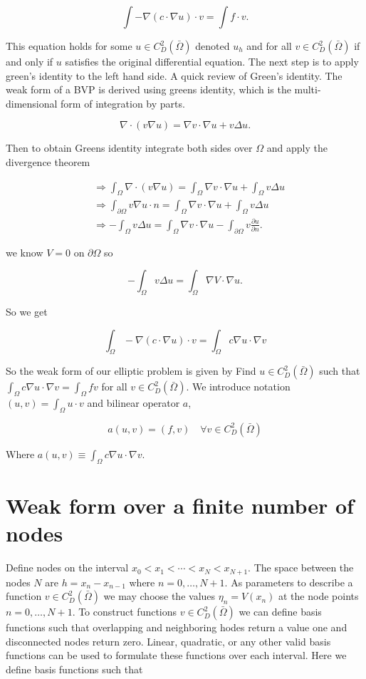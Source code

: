 \documentclass[12pt, oneside]{book}
\begin{document}
$$
\int-\nabla(c \cdot \nabla u) \cdot v=\int f \cdot v.
$$

This equation holds for some $u \in C_{D}^{2}(\bar{\Omega})$ denoted $u_{h}$ and for all 
$v \in C_{D}^{2}(\bar{\Omega})$ if and only if $u$ satisfies the original differential 
equation. The next step is to apply green's identity to the left hand side. A quick 
review of Green's identity. The weak form of a BVP is derived using greens 
identity, which is the multi-dimensional form of integration by parts.

$$
\nabla \cdot(v \nabla u)=\nabla v \cdot \nabla u+v \Delta u.
$$

Then to obtain Greens identity integrate both sides over $\Omega$ and apply the divergence theorem

$$
\begin{aligned}
& \Rightarrow \int_{\Omega} \nabla \cdot(v \nabla u)=\int_{\Omega} \nabla v \cdot \nabla u+\int_{\Omega} v \Delta u \\
& \Rightarrow \int_{\partial \Omega} v \nabla u \cdot n=\int_{\Omega} \nabla v \cdot \nabla u+\int_{\Omega} v \Delta u \\
& \Rightarrow-\int_{\Omega} v \Delta u=\int_{\Omega} \nabla v \cdot \nabla u-\int_{\partial \Omega} v \frac{\partial u}{\partial n}.
\end{aligned}
$$

we know $V=0$ on $\partial \Omega$ so

$$
-\int_{\Omega} v \Delta u=\int_{\Omega} \nabla V \cdot \nabla u.
$$

So we get

$$
\int_{\Omega}-\nabla(c \cdot \nabla u) \cdot v=\int_{\Omega} c \nabla u \cdot \nabla v
$$

So the weak form of our elliptic problem is given by Find $u \in C_{D}^{2}(\bar{\Omega})$ such 
that $\int_{\Omega} c \nabla u \cdot \nabla v=\int_{\Omega} fv$ for all $v \in C_{D}^{2}(\bar{\Omega})$.
We introduce notation $(u, v)=\int_{\Omega} u \cdot v$ and bilinear operator $a$,

$$
a(u, v)=(f, v) \quad \forall v \in C_{D}^{2}(\bar{\Omega})
$$

Where $a(u, v) \equiv \int_{\Omega} c \nabla u \cdot \nabla v$. 

\section{Weak form over a finite number of nodes}

Define nodes on the interval $x_{0}<x_{1}<\cdots<x_{N}<x_{N+1}$. The space between the nodes $N$ are $h=x_{n}-x_{n-1}$ 
where $n=0, \ldots, N+1$. As parameters to describe a function $v \in C_{D}^{2}(\bar{\Omega})$ we may choose the 
values $\eta_{n}=V\left(x_{n}\right)$ at the node points $n=0, \ldots, N+1$. To construct functions $v \in C_{D}^{2}(\bar{\Omega})$ 
we can define basis functions such that overlapping and neighboring hodes return a value one and disconnected nodes return zero.
Linear, quadratic, or any other valid basis functions can be used to formulate these functions over each interval. Here we 
define basis functions such that
\end{document}
